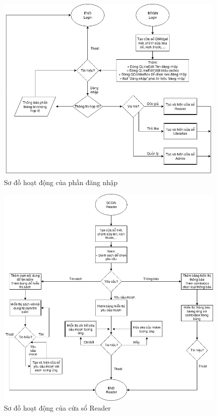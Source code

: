 \documentclass[a4paper]{article}
\begin{document}
\begin{figure}[h!]
	\begin{center}
		\includegraphics[scale=.5]{loginDiagram.png}
		\caption{Sơ đồ hoạt động của phần đăng nhập}
	\end{center}
\end{figure}
	\newpage \newpage 
\begin{figure}[h!]
	\begin{center}
		\includegraphics[scale=.5]{readerDiagram.png}
		\caption{Sơ đồ hoạt động của cửa sổ Reader}
	\end{center}
\end{figure}
\end{document}
